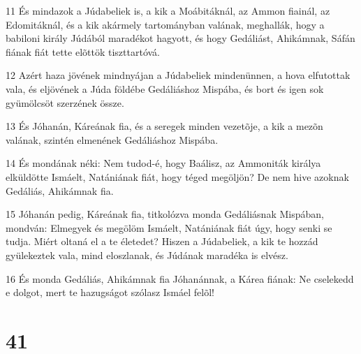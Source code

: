 \par 11 És mindazok a Júdabeliek is, a kik a Moábitáknál, az Ammon fiainál, az Edomitáknál, és a kik akármely tartományban valának, meghallák, hogy a babiloni király Júdából maradékot hagyott, és hogy Gedáliást, Ahikámnak, Sáfán fiának fiát tette elõttök tiszttartóvá.
\par 12 Azért haza jövének mindnyájan a Júdabeliek mindenünnen, a hova elfutottak vala, és eljövének a Júda földébe Gedáliáshoz Mispába, és bort és igen sok gyümölcsöt szerzének össze.
\par 13 És Jóhanán, Káreának fia, és a seregek minden vezetõje, a kik a mezõn valának, szintén elmenének Gedáliáshoz Mispába.
\par 14 És mondának néki: Nem tudod-é, hogy Baálisz, az Ammoniták királya elküldötte Ismáelt, Natániának fiát, hogy téged megöljön? De nem hive azoknak Gedáliás, Ahikámnak fia.
\par 15 Jóhanán pedig, Káreának fia, titkolózva monda Gedáliásnak Mispában, mondván: Elmegyek és megölöm Ismáelt, Natániának fiát úgy, hogy senki se tudja. Miért oltaná el a te életedet? Hiszen a Júdabeliek, a kik te hozzád gyülekeztek vala, mind eloszlanak, és Júdának maradéka is elvész.
\par 16 És monda Gedáliás, Ahikámnak fia Jóhanánnak, a Kárea fiának: Ne cselekedd e dolgot, mert te hazugságot szólasz Ismáel felõl!

\chapter{41}

